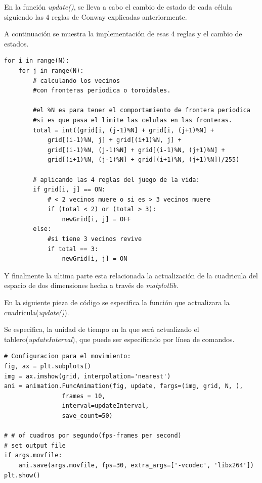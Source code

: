 \documentclass[a4paper,12pt]{article}
\begin{document}
\newpage
En la función \emph{update()}, se lleva a cabo el cambio de estado 
de cada célula siguiendo las 4 reglas de Conway explicadas anteriormente.

A continuación se muestra la implementación de esas 4 reglas y el cambio de estados.
\begin{lstlisting}
for i in range(N):
    for j in range(N):
        # calculando los vecinos
        #con fronteras periodica o toroidales.

        #el %N es para tener el comportamiento de frontera periodica
        #si es que pasa el limite las celulas en las fronteras.
        total = int((grid[i, (j-1)%N] + grid[i, (j+1)%N] +
            grid[(i-1)%N, j] + grid[(i+1)%N, j] +
            grid[(i-1)%N, (j-1)%N] + grid[(i-1)%N, (j+1)%N] +
            grid[(i+1)%N, (j-1)%N] + grid[(i+1)%N, (j+1)%N])/255)

        # aplicando las 4 reglas del juego de la vida:
        if grid[i, j] == ON:
            # < 2 vecinos muere o si es > 3 vecinos muere
            if (total < 2) or (total > 3):
                newGrid[i, j] = OFF
        else:
            #si tiene 3 vecinos revive
            if total == 3:
                newGrid[i, j] = ON
\end{lstlisting}

Y finalmente la ultima parte esta relacionada la actualización de la cuadricula del espacio
de dos dimensiones hecha a través de \emph{matplotlib}. 

En la siguiente pieza de código se especifica la función que actualizara la cuadrícula(\emph{update()}).

Se especifica, la unidad de tiempo en la que será actualizado el tablero(\emph{updateInterval}), que 
puede ser especificado por línea de comandos. 

\begin{lstlisting}
# Configuracion para el movimiento:
fig, ax = plt.subplots()
img = ax.imshow(grid, interpolation='nearest')
ani = animation.FuncAnimation(fig, update, fargs=(img, grid, N, ),
                frames = 10,
                interval=updateInterval,
                save_count=50)

# # of cuadros por segundo(fps-frames per second)
# set output file
if args.movfile:
    ani.save(args.movfile, fps=30, extra_args=['-vcodec', 'libx264'])
plt.show()
\end{lstlisting}
\newpage
\end{document}
